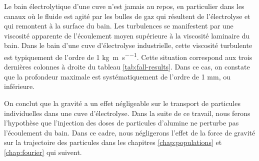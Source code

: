 \begin{remarque}

  Le bain électrolytique d'une cuve n'est jamais au repos, en
  particulier dans les canaux où le fluide est agité par les bulles de
  gaz qui résultent de l'électrolyse et qui remontent à la surface du
  bain. Les turbulences se manifestent par une viscosité apparente de
  l'écoulement moyen supérieure à la viscosité laminaire du bain. Dans
  le bain d'une cuve d'électrolyse industrielle, cette viscosité
  turbulente est typiquement de l'ordre de \num{1}
  \si{\kilo\gram\per\meter\per\second}. Cette situation correspond aux
  trois dernières colonnes à droite du tableau
  \ref{tab:fall-results}. Dans ce cas, on constate que la profondeur
  maximale est systématiquement de l'ordre de
  \num{1} \si{\milli\meter}, ou inférieure.

  On conclut que la gravité a un effet négligeable sur le transport de
  particules individuelles dans une cuve d'électrolyse. Dans la suite
  de ce travail, nous ferons l'hypothèse que l'injection des doses de
  particules d'alumine ne perturbe pas l'écoulement du bain. Dans ce
  cadre, nous négligerons l'effet de la force de gravité sur la
  trajectoire des particules dans les chapitres \ref{chap:populations}
  et \ref{chap:fourier} qui suivent.
\end{remarque}
